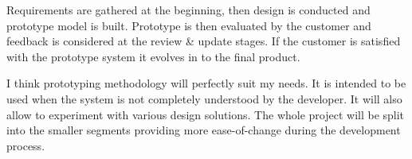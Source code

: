\documentclass[]{report}
\begin{document}
Requirements are gathered at the beginning, then design is conducted and prototype model is built. Prototype is then evaluated by the customer and feedback is considered at the review \& update stages. If the customer is satisfied with the prototype system it evolves in to the final product. 

I think prototyping methodology will perfectly suit my needs. It is intended to be used when the system is not completely understood by the developer. It will also allow to experiment with various design solutions. The whole project will be split into the smaller segments providing more ease-of-change during the development process. 



\end{document}
